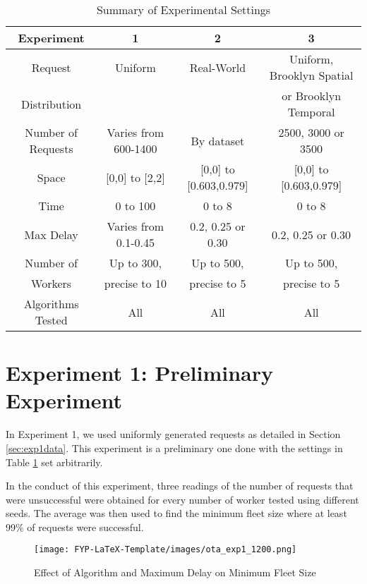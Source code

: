 \documentclass[urop]{socreport}
\begin{document}
\begin{table}[h!]
    \centering
    \begin{tabular}{|c||c|c|c|}
    \hline
         Experiment &  1 & 2 & 3\\
         \hline \hline
         Request  & Uniform & Real-World & Uniform, Brooklyn Spatial \\ Distribution&&&or Brooklyn Temporal\\
         \hline
         Number of Requests & Varies from 600-1400 & By dataset & 2500, 3000 or 3500 \\
         \hline
         Space & [0,0] to [2,2] & [0,0] to [0.603,0.979] & [0,0] to [0.603,0.979] \\
         \hline
         Time & 0 to 100 & 0 to 8 & 0 to 8 \\
         \hline
         Max Delay & Varies from 0.1-0.45 & 0.2, 0.25 or 0.30& 0.2, 0.25 or 0.30\\
         \hline
         Number of & Up to 300,  & Up to 500,  & Up to 500,  \\ Workers&precise to 10&precise to 5&precise to 5 \\
         \hline
         Algorithms Tested & All & All & All \\
         \hline
    \end{tabular}
    \caption{Summary of Experimental Settings}
    \label{tab:expsummary}
\end{table}

\section{Experiment 1: Preliminary Experiment}
In Experiment 1, we used uniformly generated requests as detailed in Section \ref{sec:exp1data}. This experiment is a preliminary one done with the settings in Table \ref{tab:expsummary} set arbitrarily.

In the conduct of this experiment, three readings of the number of requests that were unsuccessful were obtained for every number of worker tested using different seeds. The average was then used to find the minimum fleet size where at least 99\% of requests were successful. 

\begin{figure}[h]
    \centering
    \texttt{[image: FYP-LaTeX-Template/images/ota\_exp1\_1200.png]}
    \caption{Effect of Algorithm and Maximum Delay on Minimum Fleet Size}
    \label{fig:exp1graphdelay}
\end{figure}
\end{document}
